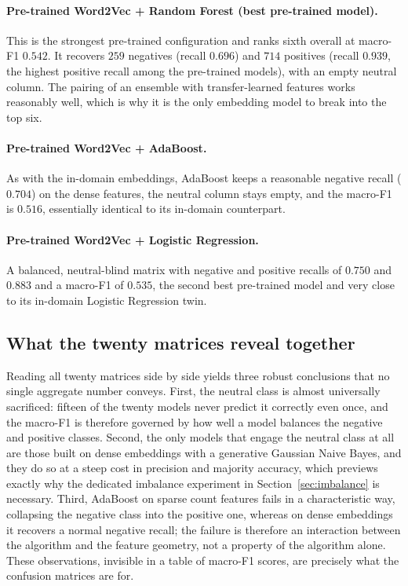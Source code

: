 \documentclass[11pt,a4paper]{article}
\begin{document}
\paragraph{Pre-trained Word2Vec + Random Forest (best pre-trained model).} This is the
strongest pre-trained configuration and ranks sixth overall at macro-F1 $0.542$. It recovers
$259$ negatives (recall $0.696$) and $714$ positives (recall $0.939$, the highest positive
recall among the pre-trained models), with an empty neutral column. The pairing of an
ensemble with transfer-learned features works reasonably well, which is why it is the only
embedding model to break into the top six.

\paragraph{Pre-trained Word2Vec + AdaBoost.} As with the in-domain embeddings, AdaBoost keeps
a reasonable negative recall ($0.704$) on the dense features, the neutral column stays empty,
and the macro-F1 is $0.516$, essentially identical to its in-domain counterpart.

\paragraph{Pre-trained Word2Vec + Logistic Regression.} A balanced, neutral-blind matrix with
negative and positive recalls of $0.750$ and $0.883$ and a macro-F1 of $0.535$, the second
best pre-trained model and very close to its in-domain Logistic Regression twin.

\subsection{What the twenty matrices reveal together}
Reading all twenty matrices side by side yields three robust conclusions that no single
aggregate number conveys. First, the neutral class is almost universally sacrificed: fifteen
of the twenty models never predict it correctly even once, and the macro-F1 is therefore
governed by how well a model balances the negative and positive classes. Second, the only
models that engage the neutral class at all are those built on dense embeddings with a
generative Gaussian Naive Bayes, and they do so at a steep cost in precision and majority
accuracy, which previews exactly why the dedicated imbalance experiment in
Section~\ref{sec:imbalance} is necessary. Third, AdaBoost on sparse count features fails in a
characteristic way, collapsing the negative class into the positive one, whereas on dense
embeddings it recovers a normal negative recall; the failure is therefore an interaction
between the algorithm and the feature geometry, not a property of the algorithm alone. These
observations, invisible in a table of macro-F1 scores, are precisely what the confusion
matrices are for.
\end{document}
